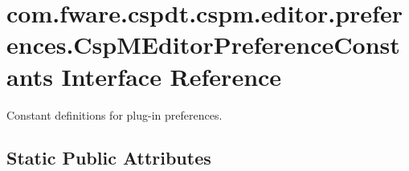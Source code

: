 \hypertarget{interfacecom_1_1fware_1_1cspdt_1_1cspm_1_1editor_1_1preferences_1_1_csp_m_editor_preference_constants}{}\section{com.\+fware.\+cspdt.\+cspm.\+editor.\+preferences.\+Csp\+M\+Editor\+Preference\+Constants Interface Reference}
\label{interfacecom_1_1fware_1_1cspdt_1_1cspm_1_1editor_1_1preferences_1_1_csp_m_editor_preference_constants}


Constant definitions for plug-\/in preferences.  


\subsection*{Static Public Attributes}
